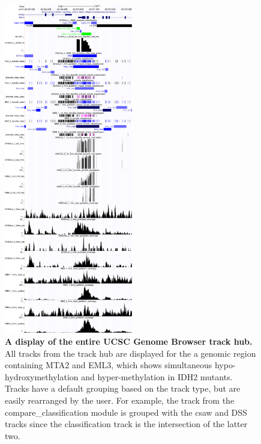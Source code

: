 \begin{figure}[ht!]
\centering
\includegraphics[width=0.5\textwidth]{chap5figs/figure5_17.pdf}
\caption[A display of the entire UCSC Genome Browser track hub.]
{
\textbf{A display of the entire UCSC Genome Browser track hub.} All tracks from the track hub are displayed for the a genomic region containing MTA2 and EML3, which shows simultaneous hypo-hydroxymethylation and hyper-methylation in IDH2 mutants. Tracks have a default grouping based on the track type, but are easily rearranged by the user. For example, the track from the compare\_classification module is grouped with the csaw and DSS tracks since the classification track is the intersection of the latter two.
}
\label{chap5:fig:17}
\end{figure}
